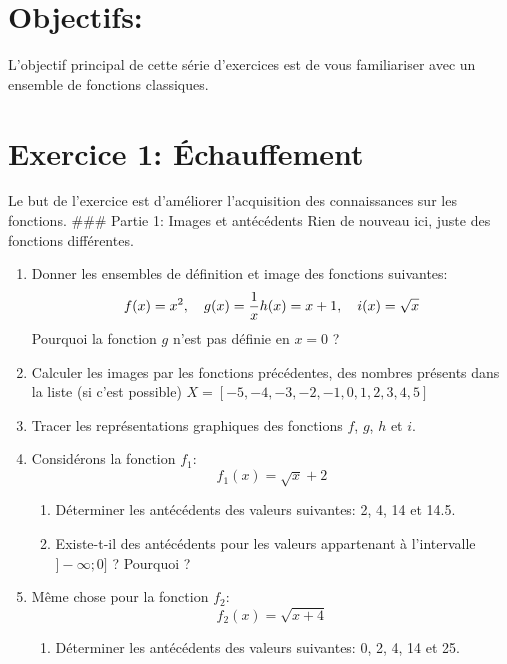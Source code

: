 \documentclass[11pt, french]{article}
\begin{document}
\section*{Objectifs:}
L'objectif principal de cette série d'exercices est de vous familiariser avec un ensemble de fonctions classiques.

\section*{Exercice 1: Échauffement}
Le but de l'exercice est d'améliorer l'acquisition des connaissances sur les fonctions.
### Partie 1: Images et antécédents
Rien de nouveau ici, juste des fonctions différentes.

\begin{enumerate}

    \item Donner les ensembles de définition et image des fonctions suivantes:
    \begin{equation*}
        f(x) = x^2, \quad g(x) = \frac{1}{x} \\
        h(x) = x + 1, \quad i(x)=\sqrt{x}
    \end{equation*}
    Pourquoi la fonction $g$ n'est pas définie en $x=0$ ?
    \item Calculer les images par les fonctions précédentes, des nombres présents dans la liste (si c'est possible) $X = [-5, -4, -3, -2, -1, 0, 1, 2, 3, 4, 5]$
    \item Tracer les représentations graphiques des fonctions $f$, $g$, $h$ et $i$.
    \item Considérons la fonction $f_1$:
    \begin{equation*}
        f_1(x) = \sqrt{x}+2
    \end{equation*}
    \begin{enumerate}
       \item Déterminer les antécédents des valeurs suivantes: 2, 4, 14 et 14.5.
       \item Existe-t-il des antécédents pour les valeurs appartenant à l'intervalle $]-\infty ; 0]$ ? Pourquoi ?
    \end{enumerate}
    \item Même chose pour la fonction $f_2$:
    \begin{equation*}
        f_2(x) = \sqrt{x+4} 
    \end{equation*}
    \begin{enumerate}
       \item Déterminer les antécédents des valeurs suivantes: 0, 2, 4, 14 et 25.

\end{enumerate}
\end{enumerate}
\end{document}
